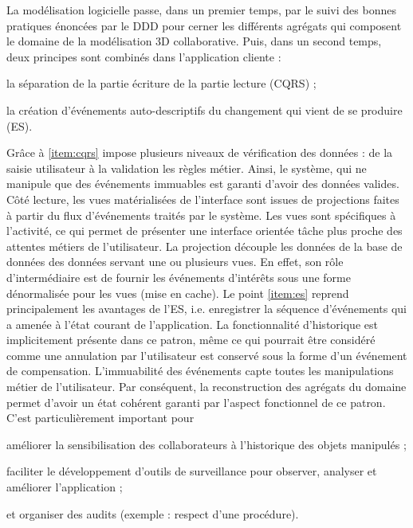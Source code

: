 La modélisation logicielle passe, 
dans un premier temps, par le suivi des bonnes pratiques énoncées par le 
\gls{DDD} pour cerner les différents agrégats qui composent le domaine de la 
modélisation 3D collaborative. 
Puis, dans un second temps, deux principes sont combinés dans l'application 
cliente : 
\begin{enumerate*}[label=(\roman*)]
	\item \label{item:cqrs}la séparation de la partie écriture de la partie lecture 
	(\gls{CQRS}) ;
	\item \label{item:es} la création d'événements auto-descriptifs du changement 
	qui vient de se 
	produire (\gls{ES}).
\end{enumerate*}
Grâce à \ref{item:cqrs} impose plusieurs niveaux de vérification des données : de 
la saisie 
utilisateur à la validation les règles métier. Ainsi, le système, qui ne manipule que 
des événements immuables est garanti d'avoir des données valides.
Côté lecture, les vues matérialisées de l'interface sont issues de projections faites 
à partir du flux d'événements traités par le système. Les vues sont spécifiques à 
l'activité, ce qui permet de présenter une interface orientée tâche plus proche des 
attentes métiers de l'utilisateur. La projection découple les données de la base 
de données des données servant une ou plusieurs vues. En effet, son rôle 
d'intermédiaire est de fournir les événements d'intérêts sous une forme 
dénormalisée pour les vues (mise en cache).
Le point \ref{item:es} reprend principalement les avantages de l'\gls{ES}, i.e. 
enregistrer la 
séquence d'événements qui a amenée à l'état courant de l'application. La 
fonctionnalité d'historique est implicitement présente dans ce patron, même ce qui 
pourrait être considéré comme une \og annulation\fg{} par l'utilisateur est conservé 
sous la forme d'un événement de compensation. L'immuabilité des événements 
capte toutes les manipulations métier de l'utilisateur. Par conséquent, la 
reconstruction des agrégats du domaine permet d'avoir un état cohérent garanti 
par l'aspect fonctionnel de ce patron. C'est particulièrement important pour 
\begin{enumerate*}[label=(\roman*)]
	\item améliorer la sensibilisation des collaborateurs à l'historique des objets 
	manipulés ;
	\item faciliter le développement d'outils de surveillance pour observer, analyser 
	et améliorer l'application ;
	\item et organiser des audits (exemple : respect d'une procédure).
\end{enumerate*}
%

